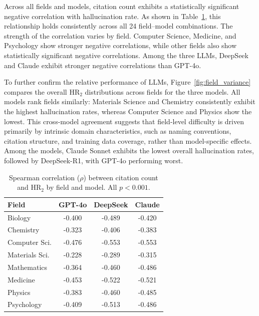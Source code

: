 \documentclass[11pt]{article}
\begin{document}
Across all fields and models, citation count exhibits a statistically significant negative correlation with hallucination rate. As shown in Table~\ref{tab:spearman_all_models}, this relationship holds consistently across all 24 field--model combinations. The strength of the correlation varies by field. Computer Science, Medicine, and Psychology show stronger negative correlations, while other fields also show statistically significant negative correlations. Among the three LLMs, DeepSeek and Claude exhibit stronger negative correlations than GPT-4o.

To further confirm the relative performance of LLMs, Figure~\ref{fig:field_variance} compares the overall HR$_2$ distributions across fields for the three models. All models rank fields similarly: Materials Science and Chemistry consistently exhibit the highest hallucination rates, whereas Computer Science and Physics show the lowest. This cross-model agreement suggests that field-level difficulty is driven primarily by intrinsic domain characteristics, such as naming conventions, citation structure, and training data coverage, rather than model-specific effects. Among the models, Claude Sonnet exhibits the lowest overall hallucination rates, followed by DeepSeek-R1, with GPT-4o performing worst.

\setlength{\tabcolsep}{5pt}
\begin{table}[tb!]
\centering
  \captionsetup{font=small}
  \footnotesize

  \begin{tabular}{@{}lccc@{}}
    \toprule
    \textbf{Field} & \textbf{GPT-4o} & \textbf{DeepSeek} & \textbf{Claude} \\
    \midrule
    Biology & -0.400 & -0.489 & -0.420 \\
    Chemistry & -0.323 & -0.406 & -0.383 \\
    Computer Sci. & -0.476 & -0.553 & -0.553 \\
    Materials Sci. & -0.228 & -0.289 & -0.315 \\
    Mathematics & -0.364 & -0.460 & -0.486 \\
    Medicine & -0.453 & -0.522 & -0.521 \\
    Physics & -0.383 & -0.460 & -0.485 \\
    Psychology & -0.409 & -0.513 & -0.486 \\
    \bottomrule
  \end{tabular}
    \caption{Spearman correlation ($\rho$) between citation count and HR$_2$ by field and model. All $p < 0.001$.}

  \label{tab:spearman_all_models}
\end{table}
\end{document}
